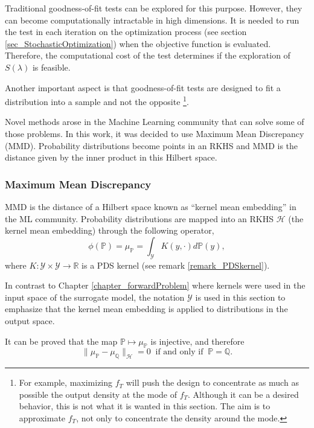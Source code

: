 Traditional goodness-of-fit tests can be explored for this purpose. 
However, they can become computationally intractable in high dimensions.
It is needed to run the test in each iteration on the optimization process (see section \ref{sec_StochasticOptimization}) when the objective function is evaluated.
Therefore, the computational cost of the test determines if the exploration of $S(\lambda)$ is feasible.

Another important aspect is that goodness-of-fit tests are designed to fit a distribution into a sample and not the opposite
\footnote{For example, maximizing $f_T$ will push the design to concentrate as much as possible the output density at the mode of $f_T$. Although it can be a desired behavior, this is not what it is wanted in this section. The aim is to approximate $f_T$, not only to concentrate the density around the mode.}.

Novel methods arose in the Machine Learning community that can solve some of those problems. 
In this work, it was decided to use Maximum Mean Discrepancy (MMD). 
Probability distributions become points in an RKHS and MMD is the distance given by the inner product in this Hilbert space. 

\subsubsection{Maximum Mean Discrepancy}

MMD is the distance of a Hilbert space known as ``kernel mean embedding'' in the ML community.
Probability distributions are mapped into an RKHS $\mathcal{H}$ (the kernel mean embedding) through the following operator,
$$
  \phi(\mathbb{P}) = \mu_{\mathbb{P}} = \int_{\mathcal{Y}} K(y,\cdot) d\mathbb{P}(y),
$$
where $K: \mathcal{Y} \times \mathcal{Y} \to \mathbb{R}$ is a PDS kernel (see remark \ref{remark_PDSkernel}). 

\begin{remark}In contrast to Chapter \ref{chapter_forwardProblem} where kernels were used in the input space of the surrogate model, the notation $\mathcal{Y}$ is used in this section to emphasize that the kernel mean embedding is applied to distributions in the output space.
\end{remark}

It can be proved that the map $\mathbb{P} \mapsto \mu_{\mathbb{P}}$ is injective, and therefore
$$
  \|\mu_{\mathbb{P}} - \mu_{\mathbb{Q}}\|_{\mathcal{H}} = 0 \ \text{ if and only if } \ \mathbb{P} = \mathbb{Q}.
$$

